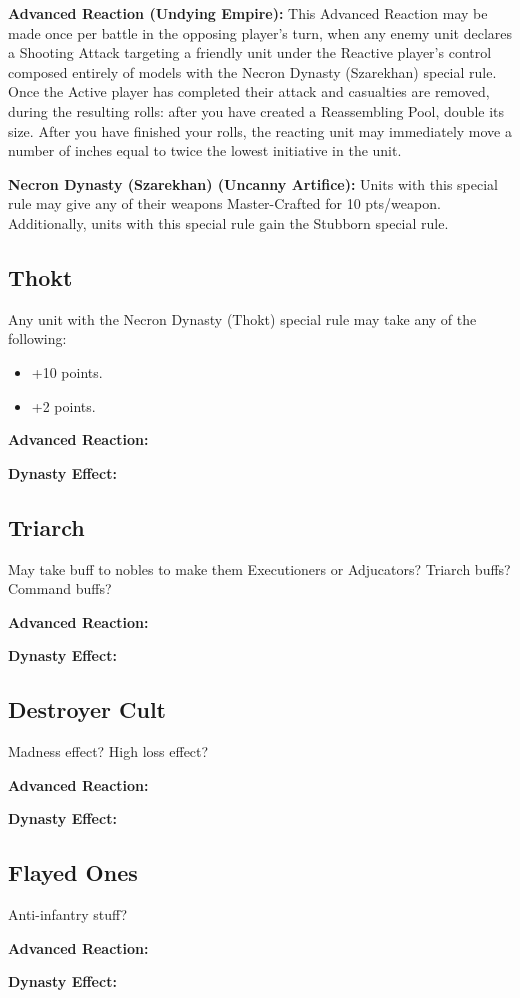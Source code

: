 \textbf{Advanced Reaction (Undying Empire):} This Advanced Reaction may be made once per battle in the opposing player's turn, when any enemy unit declares a Shooting Attack targeting a friendly unit under the Reactive player's control composed entirely of models with the Necron Dynasty (Szarekhan) special rule. Once the Active player has completed their attack and casualties are removed, during the resulting  rolls: after you have created a Reassembling Pool, double its size. After you have finished your  rolls, the reacting unit may immediately move a number of inches equal to twice the lowest initiative in the unit.

\textbf{Necron Dynasty (Szarekhan) (Uncanny Artifice):} Units with this special rule may give any of their weapons Master-Crafted for 10 pts/weapon. Additionally, units with this special rule gain the Stubborn special rule.


\subsection{Thokt}

Any unit with the Necron Dynasty (Thokt) special rule may take any of the following:
\begin{itemize}
	\item {} \dotfill +10 points.
	\item {} \dotfill +2 points.
\end{itemize}

\textbf{Advanced Reaction:}

\textbf{Dynasty Effect:} 


\subsection{Triarch}


May take buff to nobles to make them Executioners or Adjucators? Triarch buffs? Command buffs?

\textbf{Advanced Reaction:}

\textbf{Dynasty Effect:}


\subsection{Destroyer Cult}

Madness effect? High loss effect?

\textbf{Advanced Reaction:}

\textbf{Dynasty Effect:}


\subsection{Flayed Ones}

Anti-infantry stuff?

\textbf{Advanced Reaction:}

\textbf{Dynasty Effect:}